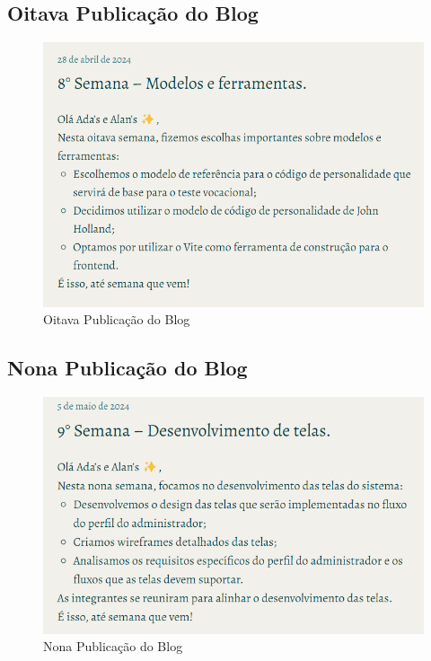 \begin{apendicesenv}
\subsection*{Oitava Publicação do Blog}
\begin{figure}[H]
    \centering
    \includegraphics[width=1.0\linewidth]{images/Post8.png}
    \caption{Oitava Publicação do Blog}
    \label{fig:oitava}
\end{figure}

\subsection*{Nona Publicação do Blog}
\begin{figure}[H]
    \centering
    \includegraphics[width=1.0\linewidth]{images/Post9.png}
    \caption{Nona Publicação do Blog}
    \label{fig:nona}
\end{figure}


\end{apendicesenv}

